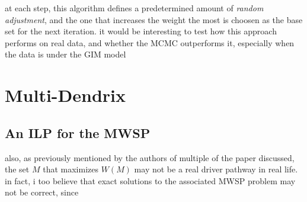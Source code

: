 at each step, this algorithm defines a predetermined amount of \textit{random adjustment}, and the one that increases the weight the most is choosen as the base set for the next iteration. it would be interesting to test how this approach performs on real data, and whether the MCMC outperforms it, especially when the data is under the GIM model

\section{Multi-Dendrix}

\subsection{An ILP for the MWSP}

also, as previously mentioned by the authors of multiple of the paper discussed, the set $M$ that maximizes $W(M)$ may not be a real driver pathway in real life. in fact, i too believe that exact solutions to the associated MWSP problem may not be correct, since 

\cleardoublepage
